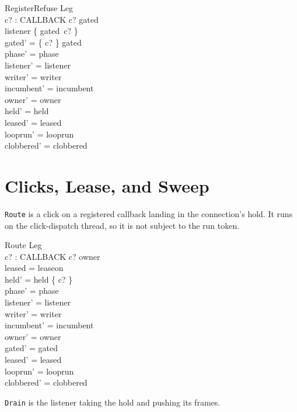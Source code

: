 \documentclass[a4paper,10pt,fleqn]{article}
\begin{document}
\begin{schema}{RegisterRefuse}
  \Delta Leg \\
  c? : CALLBACK
\where
  c? \in \dom gated \\
  listener \neq \{ gated~c? \} \\
  gated' = \{ c? \} \ndres gated \\
  phase' = phase \\
  listener' = listener \\
  writer' = writer \\
  incumbent' = incumbent \\
  owner' = owner \\
  held' = held \\
  leased' = leased \\
  looprun' = looprun \\
  clobbered' = clobbered
\end{schema}

\section{Clicks, Lease, and Sweep}

\texttt{Route} is a click on a registered callback landing in the
connection's hold.  It runs on the click-dispatch thread, so it is not
subject to the run token.

\begin{schema}{Route}
  \Delta Leg \\
  c? : CALLBACK
\where
  c? \in \dom owner \\
  leased = leaseon \\
  held' = held \cup \{ c? \} \\
  phase' = phase \\
  listener' = listener \\
  writer' = writer \\
  incumbent' = incumbent \\
  owner' = owner \\
  gated' = gated \\
  leased' = leased \\
  looprun' = looprun \\
  clobbered' = clobbered
\end{schema}

\texttt{Drain} is the listener taking the hold and pushing its frames.
\end{document}
